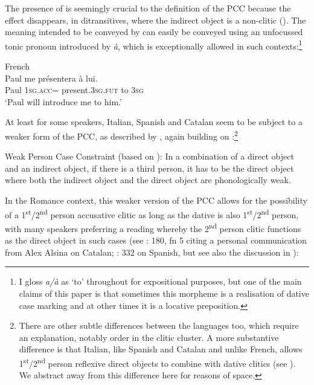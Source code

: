 \documentclass[output=paper,colorlinks,citecolor=brown,nonflat]{langsci/langscibook}
\begin{document}
The presence of  is seemingly crucial to the definition of the PCC because the effect disappears, in ditransitives, where the indirect object is a non-clitic (\citealt{Kayne1975, Rezac2008}). The meaning intended to be conveyed by  can easily be conveyed using an unfocussed tonic pronoun introduced by \textit{à}, which is exceptionally allowed in such contexts:\footnote{I gloss \textit{a/à} as ‘to’ throughout for expositional purposes, but one of the main claims of this paper is that sometimes this morpheme is a realisation of dative case marking and at other times it is a locative preposition.}

\ea%
    \label{ex:sheehan:3}
    French \citep[174]{Kayne1975}\\
    \gll    Paul   me     présentera     à   lui.\\
            Paul  \textsc{1sg}.\textsc{acc}=  present.\textsc{3sg.fut}   to   \textsc{3sg}\\
    \glt    ‘Paul will introduce me to him.’
\z

At least for some speakers, Italian, Spanish and Catalan seem to be subject to a weaker form of the PCC, as described by \citet{Bonet1991}, again building on \citet{Perlmutter1971}:\footnote{There are other subtle differences between the languages too, which require an explanation, notably order in the clitic cluster. A more substantive difference is that Italian, like Spanish and Catalan and unlike French, allows 1\textsuperscript{st}/2\textsuperscript{nd} person reflexive direct objects to combine with dative clitics (see \citealt{Kayne1975, Bianchi2006}). We abstract away from this difference here for reasons of space.}

\ea%
    \label{ex:sheehan:4}
    Weak Person Case Constraint (based on \citealt[181--182]{Bonet1991}):
    \ea\label{ex:sheehan:4a}
    In a combination of a direct object and an indirect object, if there is a third person, it has to be the direct object
    \ex\label{ex:sheehan:4b}
    where both the indirect object and the direct object are phonologically weak.
    \z
\z

In the Romance context, this weaker version of the PCC allows for the possibility of a 1\textsuperscript{st}/2\textsuperscript{nd} person accusative clitic as long as the dative is also 1\textsuperscript{st}/2\textsuperscript{nd} person, with many speakers preferring a reading whereby the 2\textsuperscript{nd} person clitic functions as the direct object in such cases (see \citealt{Bonet1991}: 180, fn 5 citing a personal communication from Alex Alsina on Catalan; \citealt{OrmazabalRomero2010}: 332 on Spanish, but see also the discussion in \citealt{Bonet2007}):
\end{document}
